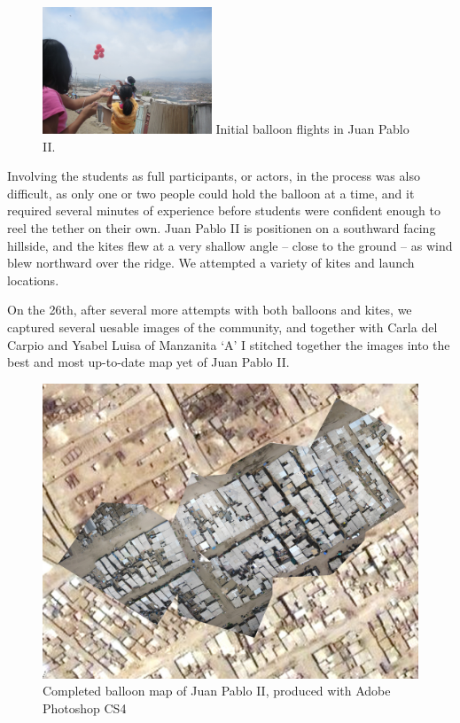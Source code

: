 \documentclass[11pt]{report}
\begin{document}
\begin{figure}
	\begin{flushright}
		\includegraphics[width=0.45\textwidth]{images/juan-pablo-first-flight.jpg}
		Initial balloon flights in Juan Pablo II.
	\end{flushright}
\end{figure}

Involving the students as full participants, or actors, in the process was also difficult, as only one or two people could hold the balloon at a time, and it required several minutes of experience before students were confident enough to reel the tether on their own. Juan Pablo II is positionen on a southward facing hillside, and the kites flew at a very shallow angle -- close to the ground -- as wind blew northward over the ridge. We attempted a variety of kites and launch locations. 

On the 26th, after several more attempts with both balloons and kites, we captured several uesable images of the community, and together with Carla del Carpio and Ysabel Luisa of Manzanita `A' I stitched together the images into the best and most up-to-date map yet of Juan Pablo II.  

\begin{figure}[h]
  \begin{center}
	\includegraphics[width=1\textwidth]{images/juan-pablo-final.jpg}
	\caption{Completed balloon map of Juan Pablo II, produced with Adobe Photoshop CS4}
  \end{center}
\end{figure}
\end{document}
